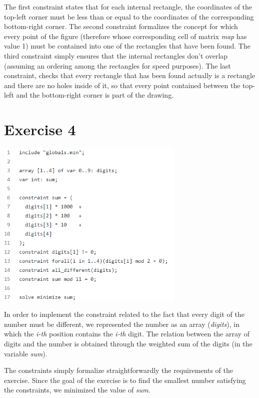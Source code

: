 \documentclass{article}
\begin{document}
The first constraint states that for each internal rectangle, the coordinates of the top-left corner must be less than
or equal to the coordinates of the corresponding bottom-right corner.
The second constraint formalizes the concept for which every point of the figure (therefore whose corresponding cell of matrix
\textit{map} has value 1) must be contained into one of the rectangles that have been found.
The third constraint simply ensures that the internal rectangles don't overlap (assuming an ordering among the rectangles
for speed purposes).
The last constraint, checks that every rectangle that has been found actually is a rectangle and there are no holes inside of it, 
so that every point contained between the top-left and the bottom-right corner is part of the drawing.

\section{Exercise 4}
\vspace{0.2cm}
\includegraphics[width=9cm]{img/Es4.png}
\vspace{0.2cm}

In order to implement the constraint related to the fact that every digit of the number must be different,
we represented the number as an array (\textit{digits}), in which the \textit{i-th} position contains the \textit{i-th} digit.
The relation between the array of digits and the number is obtained through the weighted sum of the digits (in 
the variable \textit{sum}).

The constraints simply formalize straightforwardly the requirements of the exercise. Since the goal of the exercise
is to find the smallest number satisfying the constraints, we minimized the value of \textit{sum}.
\end{document}
